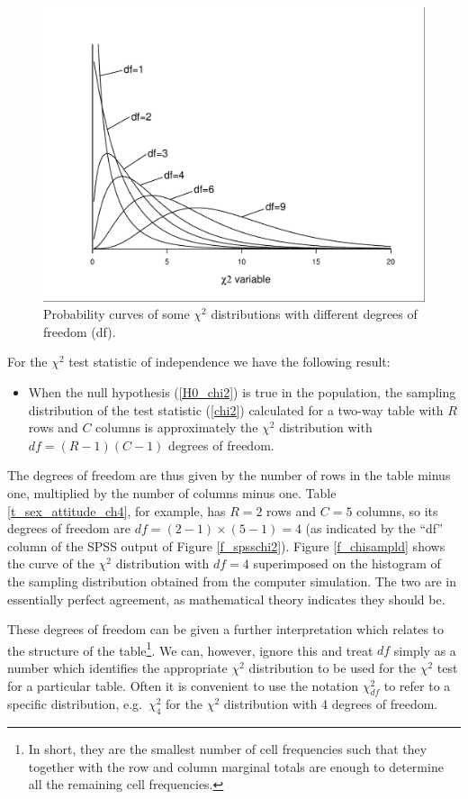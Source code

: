 \begin{figure}
\caption{Probability curves of some $\chi^{2}$ distributions with
different degrees of freedom (df).}
\label{f_chi2dists}
\vspace*{-2ex}
\begin{center}
\includegraphics[width=115mm]{chi2dists}
\end{center}
\vspace*{-3ex}
\end{figure}

For the $\chi^{2}$  test statistic of
independence we have the following result:
\begin{itemize}
\item
When the null hypothesis (\ref{H0_chi2}) is true in the population, the
sampling distribution of the test statistic (\ref{chi2}) calculated for
a two-way table with $R$ rows and $C$ columns is approximately the $\chi^{2}$
distribution with $df=(R-1)(C-1)$ degrees of freedom.
\end{itemize}
The degrees of freedom are thus given by the number of rows in the table
minus one, multiplied by the number of columns minus one. Table
\ref{t_sex_attitude_ch4}, for example, has $R=2$ rows and $C=5$ columns,
so its degrees of freedom are $df=(2-1)\times(5-1)=4$ (as indicated by
the ``df'' column of the SPSS output of Figure \ref{f_spsschi2}). Figure
\ref{f_chisampld} shows the curve of the $\chi^{2}$ distribution with
$df=4$ superimposed on the histogram of the sampling distribution
obtained from the computer simulation. The two are in essentially
perfect agreement, as mathematical theory indicates they should be.

These degrees of freedom can be given a further interpretation which
relates to the structure of the table\footnote{In short, they are the
smallest number of cell frequencies such that they together with the row
and column marginal totals are enough to determine all the remaining
cell frequencies.}. We can, however, ignore this and treat $df$ simply
as a number which identifies the appropriate $\chi^{2}$ distribution to
be used for the $\chi^{2}$ test for a particular table. Often it is
convenient to use the notation $\chi^{2}_{df}$ to refer to a specific
distribution, e.g.\ $\chi^{2}_{4}$ for  the $\chi^{2}$ distribution with
4 degrees of freedom.

